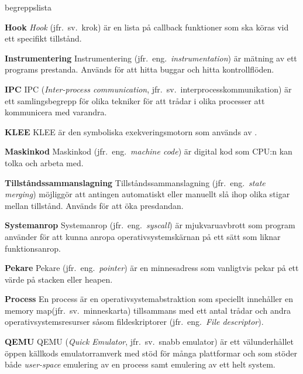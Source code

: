 \begin{labeling}{begreppslista}
    \item [\textbf{Hook}] \emph{Hook} (jfr.\ sv.\ krok) är en lista på callback
    funktioner som ska köras vid ett specifikt tillstånd.

    \item [\textbf{Instrumentering}] Instrumentering (jfr.\ eng.\
    \emph{instrumentation}) är mätning av ett programs prestanda. Används för
    att hitta buggar och hitta kontrollflöden.

    \item [\textbf{IPC}] IPC (\emph{Inter-process communication}, jfr.\ sv.\
    interprocesskommunikation) är ett samlingsbegrepp för olika tekniker
    för att trådar i olika processer att kommunicera med varandra.

    \item [\textbf{KLEE}] KLEE är den symboliska exekveringsmotorn som används
    av \stoe{}.

    \item [\textbf{Maskinkod}] Maskinkod (jfr.\ eng.\ \emph{machine code}) är
    digital kod som CPU:n kan tolka och arbeta med.

    \item [\textbf{Tillståndssammanslagning}] Tillståndssammanslagning (jfr.\
    eng.\ \emph{state merging}) möjliggör att antingen automatiskt eller
    manuellt slå ihop olika stigar mellan tillstånd. Används för att öka
    presdandan.

    \item [\textbf{Systemanrop}] Systemanrop (jfr.\ eng.\ \emph{syscall}) är
    mjukvaruavbrott som program använder för att kunna anropa
    operativsystemskärnan på ett sätt som liknar funktionsanrop.

    \item [\textbf{Pekare}] Pekare (jfr.\ eng.\ \emph{pointer}) är en minnesadress som
    vanligtvis pekar på ett värde på stacken eller heapen.

    \item [\textbf{Process}] En process är en
    operativsystemabstraktion som speciellt innehåller en memory
    map(jfr.\ sv.\ minneskarta) tillsammans med ett antal trådar och
    andra operativsystemsresurser såsom fildeskriptorer (jfr.\
    eng.\ \emph{File descriptor}).

    \item [\textbf{QEMU}] QEMU (\emph{Quick Emulator}, jfr.\ sv.\ snabb
        emulator) är ett välunderhållet öppen källkods emulatorramverk
    med stöd för många plattformar och som stöder både \emph{user-space}
    emulering av en process samt emulering av ett helt system.


\end{labeling}
